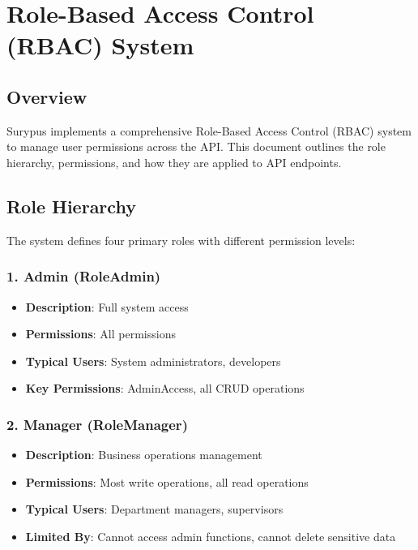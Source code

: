 \chapter{Role-Based Access Control (RBAC)
System}\label{role-based-access-control-rbac-system}

\section{Overview}\label{overview}

Surypus implements a comprehensive Role-Based Access Control (RBAC)
system to manage user permissions across the API. This document outlines
the role hierarchy, permissions, and how they are applied to API
endpoints.

\section{Role Hierarchy}\label{role-hierarchy}

The system defines four primary roles with different permission levels:

\subsection{\texorpdfstring{1. \textbf{Admin
(RoleAdmin)}}{1. Admin (RoleAdmin)}}\label{admin-roleadmin}

\begin{itemize}
\tightlist
\item
  \textbf{Description}: Full system access
\item
  \textbf{Permissions}: All permissions
\item
  \textbf{Typical Users}: System administrators, developers
\item
  \textbf{Key Permissions}: AdminAccess, all CRUD operations
\end{itemize}

\subsection{\texorpdfstring{2. \textbf{Manager
(RoleManager)}}{2. Manager (RoleManager)}}\label{manager-rolemanager}

\begin{itemize}
\tightlist
\item
  \textbf{Description}: Business operations management
\item
  \textbf{Permissions}: Most write operations, all read operations
\item
  \textbf{Typical Users}: Department managers, supervisors
\item
  \textbf{Limited By}: Cannot access admin functions, cannot delete
  sensitive data
\end{itemize}

